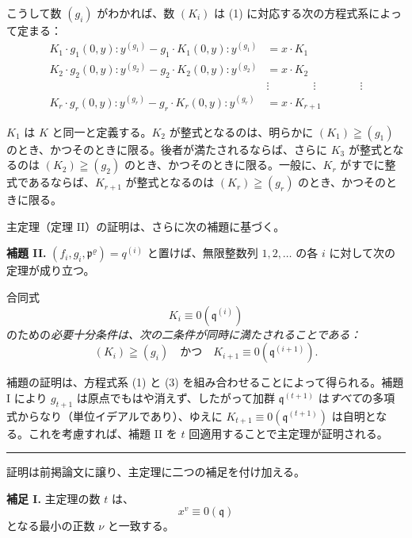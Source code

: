 こうして数 \((g_i)\) がわかれば、数 \((K_i)\) は (1) に対応する次の方程式系によって定まる：
\begin{equation}
\tag{3}
\begin{aligned}
K_1\cdot g_1(0,y):y^{(g_1)} - g_1\cdot K_1(0,y):y^{(g_1)} &= x\cdot K_1\\
K_2\cdot g_2(0,y):y^{(g_2)} - g_2\cdot K_2(0,y):y^{(g_2)} &= x\cdot K_2\\
&\vdots \qquad\qquad\vdots\qquad\qquad\vdots\\
K_r\cdot g_r(0,y):y^{(g_r)} - g_r\cdot K_r(0,y):y^{(g_r)} &= x\cdot K_{r+1}
\end{aligned}
\end{equation}

\(K_1\) は \(K\) と同一と定義する。\(K_2\) が整式となるのは、明らかに \((K_1)\geqq(g_1)\) のとき、かつそのときに限る。後者が満たされるならば、さらに \(K_3\) が整式となるのは \((K_2)\geqq(g_2)\) のとき、かつそのときに限る。一般に、\(K_r\) がすでに整式であるならば、\(K_{r+1}\) が整式となるのは \((K_r)\geqq(g_r)\) のとき、かつそのときに限る。

主定理（定理 II）の証明は、さらに次の補題に基づく。

\textbf{補題 II.} \((f_i,g_i,\mathfrak{p}^\varrho)=q^{(i)}\) と置けば、無限整数列 \(1,2,\ldots\) の各 \(i\) に対して次の定理が成り立つ。

合同式
\[
K_i\equiv0(\mathfrak{q}^{(i)})
\]
のための\emph{必要十分条件は、次の二条件が同時に満たされることである：}
\[
(K_i)\geqq(g_i)\quad \text{かつ}\quad K_{i+1}\equiv0(\mathfrak{q}^{(i+1)}).
\]

補題の証明は、方程式系 (1) と (3) を組み合わせることによって得られる。補題 I により \(g_{t+1}\) は原点でもはや消えず、したがって加群 \(\mathfrak{q}^{(t+1)}\) は\emph{すべて}の多項式からなり（単位イデアルであり）、ゆえに \(K_{t+1}\equiv0(\mathfrak{q}^{(t+1)})\) は自明となる。これを考慮すれば、補題 II を \(t\) 回適用することで主定理が証明される。

\begin{center}
\rule{4cm}{0.4pt}
\end{center}

証明は前掲論文に譲り、主定理に二つの補足を付け加える。

\textbf{補足 I.} 主定理の数 \(t\) は、
\[
x^v\equiv0(\mathfrak{q})
\]
となる最小の正数 \(\nu\) と一致する。

